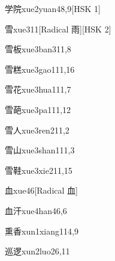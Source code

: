 \begin{entry}{学院}{xue2yuan4}{8,9}[HSK 1]
\end{entry}

\begin{entry}{雪}{xue3}{11}[Radical 雨][HSK 2]
\end{entry}

\begin{entry}{雪板}{xue3ban3}{11,8}
\end{entry}

\begin{entry}{雪糕}{xue3gao1}{11,16}
\end{entry}

\begin{entry}{雪花}{xue3hua1}{11,7}
\end{entry}

\begin{entry}{雪葩}{xue3pa1}{11,12}
\end{entry}

\begin{entry}{雪人}{xue3ren2}{11,2}
\end{entry}

\begin{entry}{雪山}{xue3shan1}{11,3}
\end{entry}

\begin{entry}{雪鞋}{xue3xie2}{11,15}
\end{entry}

\begin{entry}{血}{xue4}{6}[Radical 血]
\end{entry}

\begin{entry}{血汗}{xue4han4}{6,6}
\end{entry}

\begin{entry}{熏香}{xun1xiang1}{14,9}
\end{entry}

\begin{entry}{巡逻}{xun2luo2}{6,11}
\end{entry}


